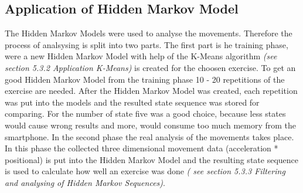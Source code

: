 \subsection{Application of Hidden Markov Model}

The Hidden Markov Models were used to analyse the movements. Therefore the process of analsysing is split into two parts. The first part is he training phase, were a new Hidden Markov Model with help of the K-Means algorithm \textit{\small(see section 5.3.2 Application K-Means)} is created for the choosen exercise. To get an good Hidden Markov Model from the training phase 10 - 20 repetitions of the exercise are needed. After the Hidden Markov Model was created, each repetition was put into the models and the resulted state sequence was stored for comparing. For the number of state five was a good choice, because less states would cause wrong results and more, would consume too much memory from the smartphone. In the second phase the real analysis of the movements takes place. In this phase the collected three dimensional movement data (acceleration * positional) is put into the Hidden Markov Model and the resulting state sequence is used to calculate how well an exercise was done \textit{\small(  see section 5.3.3 Filtering and analysing of Hidden Markov Sequences)}.
